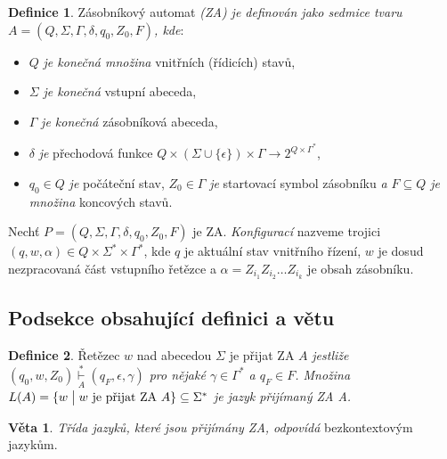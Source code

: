 \documentclass[a4paper,twocolumn,11pt]{article}[06-03-2022]
\theoremstyle{definition}
\newtheorem{theorem}{Definice}
\newtheorem{sentence}{Věta}
\begin{document}
\begin{theorem}\label{def1}
    Zásobníkový automat \emph{(ZA) je definován jako sedmice tvaru $A = (Q, \Sigma, \Gamma, \delta, q_0, Z_0, F)$, kde}: 
    \begin{itemize}
        \item $Q$ \emph{je konečná množina} vnitřních (řídicích) stavů,
        \item $\Sigma$ \emph{je konečná} vstupní abeceda,
        \item $\Gamma$ \emph{je konečná} zásobníková abeceda,
        \item $\delta$ \emph{je} přechodová funkce $Q \times (\Sigma \cup \{\epsilon\}) \times \Gamma \rightarrow 2^{Q \times \Gamma^\ast}$,
        \item $q_0 \in Q$ \emph{je} počáteční stav, $Z_0 \in \Gamma$ \emph{je} startovací symbol zásobníku \emph{a $F \subseteq Q$ je množina} koncových stavů.
    \end{itemize}
\end{theorem}
Nechť $P = (Q, \Sigma, \Gamma, \delta, q_0, Z_0, F)$ je ZA. \emph{Konfigurací} nazveme trojici $(q,w,\alpha) \in Q \times \Sigma^\ast \times \Gamma^\ast$, kde $q$ je aktuální stav vnitřního řízení, $w$ je dosud nezpracovaná část vstupního řetězce a $\alpha = Z_{i_1} Z_{i_2} \ldots Z_{i_k}$ je obsah zásobníku.

\subsection{Podsekce obsahující definici a větu}
\begin{theorem}\label{def2}
    Řetězec $w$ nad abecedou $\Sigma$ je přijat ZA $A$ \emph{jestliže $(q_0, w, Z_0) \overset{\ast}{\underset{A}{\vdash}} (q_F, \epsilon, \gamma)$ pro nějaké $\gamma \in \Gamma^\ast$ a $q_F \in F$.
    Množina $L(A) = \{w \bigm| w \textrm{ je přijat ZA } A \} \subseteq \Sigma^\ast$ je jazyk přijímaný ZA A.}
\end{theorem}
\begin{sentence}
    \emph{Třída jazyků, které jsou přijímány ZA, odpovídá} bezkontextovým jazykům.
\end{sentence}
\end{document}
